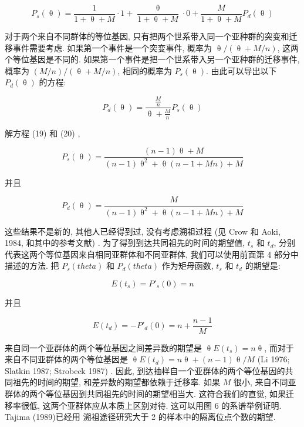 \documentclass[12pt]{article}
\begin{document}
\begin{equation} \label{eq:19}
    P_{s}(\uptheta)=\frac{1}{1+\uptheta +M}\cdot 1+\frac{\uptheta}{1+\uptheta +M}\cdot 0+\frac{M}{1+\uptheta +M}P_{d}(\uptheta)
\end{equation}

对于两个来自不同群体的等位基因, 只有把两个世系带入同一个亚种群的突变和迁移事件需要考虑. 如果第一个事件是一个突变事件,
概率为 $\uptheta /(\uptheta +M/n)$, 这两个等位基因是不同的. 如果第一个事件是把一个世系带入另一个亚种群的迁移事件, 概率为
$(M/n)/(\uptheta +M/n)$, 相同的概率为 $P_{s}(\uptheta)$. 由此可以导出以下 $P_{d}(\uptheta)$ 的方程:

\begin{equation} \label{eq:20}
    P_{d}(\uptheta)=\frac{\frac{M}{n}}{\uptheta +\frac{M}{n}}P_{s}(\uptheta)
\end{equation}

解方程 (19) 和 (20) ,

\begin{equation} \label{eq:21}
    P_{s}(\uptheta)=\frac{(n-1)\uptheta +M}{(n-1)\uptheta ^{2}+\uptheta (n-1+Mn)+M}
\end{equation}

并且

\begin{equation} \label{eq:22}
    P_{d}(\uptheta)=\frac{M}{(n-1)\uptheta ^{2}+\uptheta (n-1+Mn)+M}
\end{equation}

这些结果不是新的, 其他人已经得到过, 没有考虑溯祖过程 (见 Crow 和 Aoki, 1984, 和其中的参考文献) .
为了得到到达共同祖先的时间的期望值, $t_{s}$ 和 $t_{d}$, 分别代表这两个等位基因来自相同亚群体和不同亚群体,
我们可以使用前面第 4 部分中描述的方法. 把 $P_{s}(theta )$ 和 $P_{d}(theta )$ 作为矩母函数,
$t_{s}$ 和 $t_{d}$ 的期望是:

\begin{equation} \label{eq:23}
    E(t_{s}) = P'_{s}(0) = n
\end{equation}

并且

\begin{equation} \label{eq:24}
    E(t_{d}) = -P'_{d}(0) = n + \frac{n-1}{M}
\end{equation}

来自同一个亚群体的两个等位基因之间差异数的期望是 $\uptheta E(t_{s}) = n \uptheta$, 而对于来自不同亚群体的两个等位基因是
$\uptheta E(t_{d}) = n \uptheta +(n-1)\uptheta /M$ (Li 1976; Slatkin 1987; Strobeck 1987) . 因此,
到达抽样自一个亚群体的两个等位基因的共同祖先的时间的期望, 和差异数的期望都依赖于迁移率. 如果 $M$ 很小,
来自不同亚群体的两个等位基因到共同祖先的时间的期望相当大. 这符合我们的直觉, 如果迁移率很低, 这两个亚群体应从本质上区别对待.
这可以用图 6 的系谱举例证明. Tajima (1989)已经用 溯祖途径研究大于 2 的样本中的隔离位点个数的期望.
\end{document}
